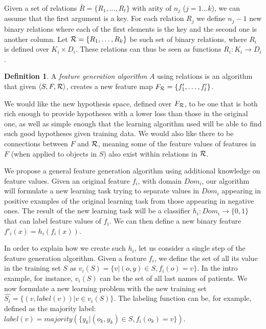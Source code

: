 \documentclass[12pt, a4paper]{article}
\theoremstyle{definition}
\newtheorem{defn}{Definition}[section]
\begin{document}
Given a set of relations $\bar{R}=\{R_{1},\ldots,R_{t}\}$ with arity of $n_{j}$ ($j=1\ldots k$), we can assume  that the first argument is a key. For each relation $R_{j}$ we define $n_{j}-1$ new binary relations where each of the first elements is the key and the second one is another column.
Let ${\cal R}=\{R_{1},\ldots,R_{k}\}$ be such set of binary relations, where $R_{i}$ is defined over $K_{i}\times D_{i}$. These relations can thus be seen as functions $R_{i}: K_{i}\rightarrow D_{i}$.

\begin{defn}
A \emph{feature generation algorithm} $A$ using relations is an algorithm that given $\langle S,F,{\cal R} \rangle$, creates a new feature map $F_{\cal R}=\{f'_{1},\ldots,f'_{l}\}$.
\end{defn}

We would like the new hypothesis space, defined over $F_{\cal R}$, to be one that is both rich enough to provide hypotheses with a lower loss than those in the original one, as well as simple enough that the learning algorithm used will be able to find such good hypotheses given training data.
We would also like there to be connections between $F$ and ${\cal R}$, meaning some of the feature values of features in $F$ (when applied to objects in $S$) also exist within relations in $\cal R$.

We propose a general feature generation algorithm using additional knowledge on feature values.
Given an original feature $f_{i}$, with domain $Dom_i$, our algorithm will formulate a new learning task trying to separate values in $Dom_i$ appearing in positive examples of the original learning task from those appearing in negative ones.  The result of the new learning task will be a classifier
$h_{i}:Dom_{i}\rightarrow \{0,1\}$ that can label feature values of $f_{i}$. We can then define a new binary feature $f'_{i}(x)=h_{i}(f_{i}(x))$.

In order to explain how we create such $h_{i}$, let us consider a single step of the feature generation algorithm.
Given a feature $f_{i}$, we define the set of all its value in the training set $S$ as $v_i(S) = \{v | (o,y) \in S, f_{i}(o)=v\}$. In the intro example, for instance, $v_i(S)$ can be the set of all last names of patients.
We now formulate a new learning problem with the new training set
$\hat{S_i} = \{ (v, label(v)) | v \in v_i(S) \}$.
The labeling function can be, for example, defined as
the majority label: $label(v)=majority(\{y_k| \left(o_k,y_k \right) \in S, f_{i}(o_k)=v\})$.
\end{document}
